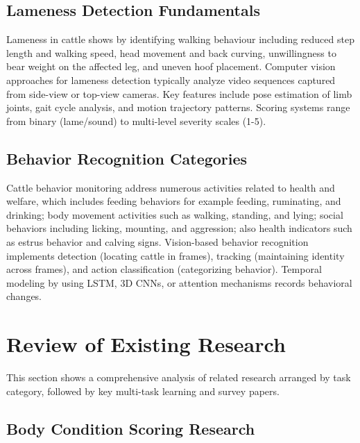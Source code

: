 \subsection{Lameness Detection Fundamentals}

Lameness in cattle shows by identifying walking behaviour including reduced step length and walking speed, head movement and back curving, unwillingness to bear weight on the affected leg, and uneven hoof placement. Computer vision approaches for lameness detection typically analyze video sequences captured from side-view or top-view cameras. Key features include pose estimation of limb joints, gait cycle analysis, and motion trajectory patterns. Scoring systems range from binary (lame/sound) to multi-level severity scales (1-5).

\subsection{Behavior Recognition Categories}

Cattle behavior monitoring address numerous activities related to health and welfare, which includes feeding behaviors for example feeding, ruminating, and drinking; body movement activities such as walking, standing, and lying; social behaviors including licking, mounting, and aggression; also health indicators such as estrus behavior and calving signs. Vision-based behavior recognition implements detection (locating cattle in frames), tracking (maintaining identity across frames), and action classification (categorizing behavior). Temporal modeling by using LSTM, 3D CNNs, or attention mechanisms records behavioral changes.



\section{Review of Existing Research}

This section shows a comprehensive analysis of related research arranged by task category, followed by key multi-task learning and survey papers.

\subsection{Body Condition Scoring Research}

